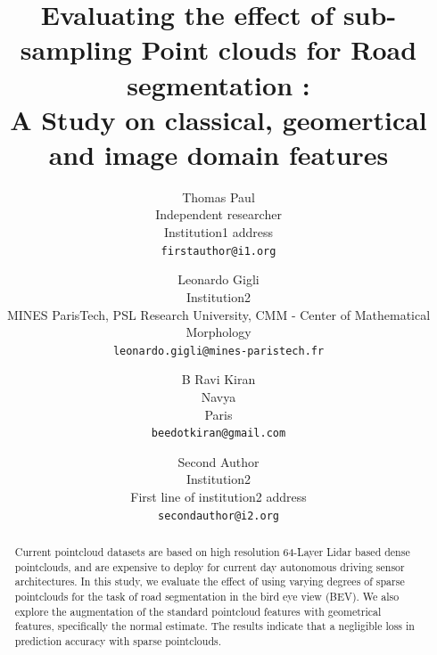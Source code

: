 \documentclass[10pt,twocolumn,letterpaper]{article}
\begin{document}
\title{Evaluating the effect of sub-sampling Point clouds for Road segmentation : \\ A Study on classical, geomertical and image domain features}

\author{Thomas Paul\\
Independent researcher\\
Institution1 address\\
{\tt\small firstauthor@i1.org}
\and
Leonardo Gigli\\
Institution2\\
MINES ParisTech, PSL Research University, CMM - Center of Mathematical Morphology\\
{\tt\small leonardo.gigli@mines-paristech.fr}
\and
B Ravi Kiran\\
Navya\\
Paris\\
{\tt\small beedotkiran@gmail.com}
\and
Second Author\\
Institution2\\
First line of institution2 address\\
{\tt\small secondauthor@i2.org}
}

\maketitle
\ificcvfinal\thispagestyle{empty}\fi

\begin{abstract}
Current pointcloud datasets are based on high resolution 64-Layer Lidar based dense pointclouds, and are expensive to deploy for current day autonomous driving sensor architectures. In this study, we evaluate the effect of using varying degrees of sparse pointclouds for the task of road segmentation in the bird eye view (BEV). We also explore the augmentation of the standard pointcloud features with geometrical features, specifically the normal estimate. The results indicate that a negligible loss in prediction accuracy with sparse pointclouds.
\end{abstract}
\end{document}
